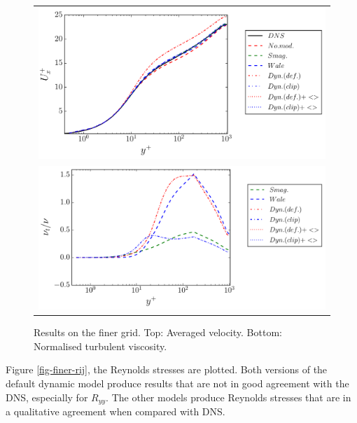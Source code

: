 \documentclass[a4paper]{article}
\begin{document}
\begin{figure}[htbp]
\begin{tabular}{c}
\includegraphics[width=\textwidth]{./finer/um.pdf} \\
\includegraphics[width=\textwidth]{./finer/nu.pdf}
\end{tabular}
\caption{Results on the finer grid. Top: Averaged velocity. Bottom: Normalised turbulent viscosity.}
\label{fig-finer-umnu}
\end{figure}

Figure \ref{fig-finer-rij}, the Reynolds stresses are plotted. Both versions of the default dynamic model produce results that are not in good agreement with the DNS, especially for $R_{yy}$. The other models produce Reynolds stresses that are in a qualitative agreement when compared with DNS.
\end{document}
